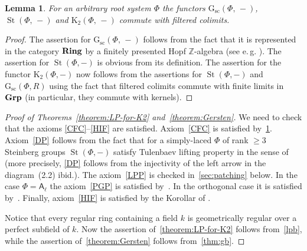 \documentclass[oneside, 11pt]{amsart} \pdfoutput=1
\newcommand{\K}{{\mathrm{K}}}
\newcommand{\St}{\mathop{\mathrm{St}}\nolimits}
\newcommand{\Gsc}{\mathrm{G}_\mathrm{sc}}
\numberwithin{equation}{section}
\newtheorem{lemma}{Lemma} \numberwithin{lemma}{section}
\theoremstyle{definition}
\newcommand{\ZZ}{\mathbb{Z}}
\newcommand{\rA}{\mathsf{A}}
\newcommand{\catname}[1]{{\normalfont\textbf{#1}}} %
\begin{document}
\begin{lemma} \label{k2cdc} 
For an arbitrary root system $\Phi$ the functors $\Gsc(\Phi,\,-)$, $\St(\Phi,\,-)$ and $\K_2(\Phi,\,-)$ commute with filtered colimits.
\end{lemma}
\begin{proof}
The assertion for $\mathrm G_{\mathrm{sc}}(\Phi,\,-)$ follows from the fact that it is represented in the category $\catname{Ring}$ by a finitely presented Hopf $\ZZ$-algebra (see e.\,g. \cite[Lemma~10.127.3]{stacks-project}). The assertion for $\St(\Phi, -)$ is obvious from its definition. The assertion for the functor $\K_2(\Phi, -)$ now follows from the assertions for $\St(\Phi, -)$ and $\Gsc(\Phi, R)$ using the fact that filtered colimits commute with finite limits in $\catname{Grp}$ (in particular, they commute with kernels).
\end{proof}

\begin{proof}[Proof of Theorems~\ref{theorem:LP-for-K2} and~\ref{theorem:Gersten}]
We need to check that the axioms \ref{CFC}--\ref{HIF} are satisfied. Axiom~\ref{CFC} is satisfied by~\cref{k2cdc}. Axiom~\ref{DP} follows from the fact that for a simply-laced $\Phi$ of rank $\geq 3$ Steinberg groups $\St(\Phi, -)$ satisfy Tulenbaev lifting property in the sense of~\cite[Definition~2.1]{LS17} (more precisely, \ref{DP} follows from the injectivity of the left arrow in the diagram~(2.2) ibid.).
The axiom~\ref{LPP} is checked in~\cref{sec:patching} below.
In the case $\Phi = \rA_\ell$ the axiom~\ref{PGP} is satisfied by~\cite[Theorem~5.1]{Tu83}. In the orthogonal case it is satisfied by~\cite[Theorem~1]{LS20}. Finally, axiom~\ref{HIF} is satisfied by the Korollar of \cite[Satz~1]{Re75}.

Notice that every regular ring containing a field $k$ is geometrically regular over a perfect subfield of $k$. Now the assertion of~\cref{theorem:LP-for-K2} follows from~\cref{lpb}, while the assertion of~\cref{theorem:Gersten} follows from~\cref{thm:gb}.
\end{proof}
\end{document}
